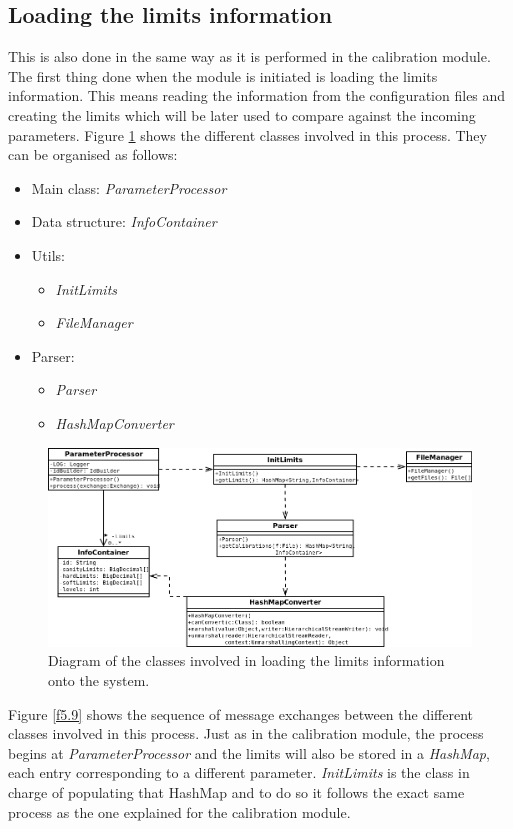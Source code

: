 \subsection{Loading the limits information}
This is also done in the same way as it is performed in the calibration module. The first thing done when the module is initiated is loading the limits information. This means reading the information from the configuration files and creating the limits which will be later used to compare against the incoming parameters.
Figure \ref{f5.8} shows the different classes involved in this process. They can be organised as follows:
\begin{itemize}
\item Main class: \emph{ParameterProcessor}
\item Data structure: \emph{InfoContainer}
\item Utils:
	\begin{itemize}
		\item \emph{InitLimits}
		\item \emph{FileManager}
	\end{itemize}
\item Parser:
	\begin{itemize}
		\item \emph{Parser}
		\item \emph{HashMapConverter}
	\end{itemize}
\end{itemize}

\begin{figure}[H]
\centerline{\includegraphics[width=1\textwidth]{images/LoadLimitsClassDiagram.png}}
\caption{Diagram of the classes involved in loading the limits information onto the system.}
\label{f5.8}
\end{figure}
\pagebreak

Figure \ref{f5.9} shows the sequence of message exchanges between the different classes involved in this process. Just as in the calibration module, the process begins at \emph{ParameterProcessor} and the limits will also be stored in a \emph{HashMap}, each entry corresponding to a different parameter. \emph{InitLimits} is the class in charge of populating that HashMap and to do so it follows the exact same process as the one explained for the calibration module. 



